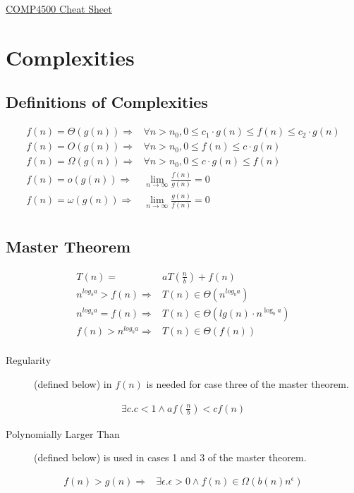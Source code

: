 \documentclass[landscape]{cheat}
\begin{document}
\footnotesize
\begin{multicols*}{3}

\begin{center}
\Large{\underline{COMP4500 Cheat Sheet}} \\
\end{center}

\section{Complexities}

\subsection{Definitions of Complexities}
\begin{align*}
    f(n) = \Theta(g(n)) \Rightarrow& \forall n > n_0, 0 \leq c_1 \cdot g(n) \leq f(n) \leq c_2 \cdot g(n) \\
    f(n) = O(g(n)) \Rightarrow& \forall n > n_0, 0 \leq f(n) \leq c \cdot g(n) \\
    f(n) = \Omega(g(n)) \Rightarrow& \forall n > n_0, 0 \leq c \cdot g(n) \leq f(n) \\
    f(n) = o(g(n)) \Rightarrow& \lim_{n \rightarrow \infty} \frac {f(n)} {g(n)} = 0 \\
    f(n) = \omega(g(n)) \Rightarrow& \lim_{n \rightarrow \infty} \frac {g(n)} {f(n)} = 0 \\
\end{align*}

\subsection{Master Theorem}
\begin{align*}
    T(n) =& a T\left(\frac n b\right) + f(n) \\
    n^{log_b a} > f(n) \Rightarrow& T(n) \in \Theta(n^{log_b a}) \\
    n^{log_b a} = f(n) \Rightarrow& T(n) \in \Theta(lg(n) \cdot n^{\log_b a}) \\
    f(n) > n^{log_b a} \Rightarrow& T(n) \in \Theta(f(n)) \\
\end{align*}

\begin{description}
    \item[Regularity] (defined below) in $f(n)$ is needed for case three of the master theorem.
\end{description}
\begin{align*}
    \exists c. c < 1 \land af\left(\frac n b\right) < cf(n)
\end{align*}
\begin{description}
    \item[Polynomially Larger Than] (defined below) is used in cases 1 and 3 of the master theorem.
\end{description}
\begin{align*}
    f(n) > g(n) \Rightarrow& \exists \epsilon. \epsilon > 0 \land f(n) \in \Omega(b(n) n^\epsilon)
\end{align*}


\end{multicols*}
\end{document}
